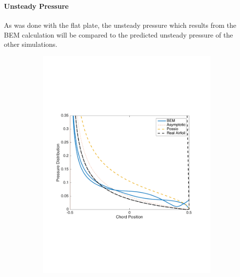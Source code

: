 \documentclass{article}
\begin{document}
\newpage
\noindent \textbf{Unsteady Pressure}\\ \\
\noindent As was done with the flat plate, the unsteady pressure which results from the BEM calculation will be compared to the predicted unsteady pressure of the other simulations. \\ 

\begin{figure}[h]
\centering
\begin{subfigure}{0.3\textwidth}
	\centering
	\includegraphics[width = \textwidth, height=0.16\textheight]{NACA0003_pressure_k5mag}
\end{subfigure}%
\begin{subfigure}{0.3\textwidth}
	\centering

\end{subfigure}
\end{figure}
\end{document}
